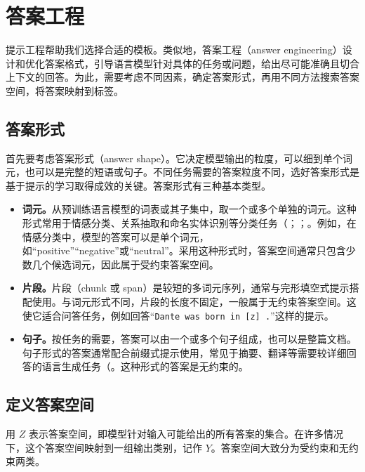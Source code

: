 \section{答案工程}
\label{sec:ch03-answers}
提示工程帮助我们选择合适的模板。类似地，答案工程（answer engineering）设计和优化答案格式，引导语言模型针对具体的任务或问题，给出尽可能准确且切合上下文的回答。为此，需要考虑不同因素，确定答案形式，再用不同方法搜索答案空间，将答案映射到标签。

\subsection{答案形式}
首先要考虑答案形式（answer shape）。它决定模型输出的粒度，可以细到单个词元，也可以是完整的短语或句子。不同任务需要的答案粒度不同，选好答案形式是基于提示的学习取得成效的关键。答案形式有三种基本类型。

\begin{itemize}
\item \textbf{词元。}从预训练语言模型的词表或其子集中，取一个或多个单独的词元。这种形式常用于情感分类、关系抽取和命名实体识别等分类任务（；；。例如，在情感分类中，模型的答案可以是单个词元，如“positive”“negative”或“neutral”。采用这种形式时，答案空间通常只包含少数几个候选词元，因此属于受约束答案空间。
\item \textbf{片段。}片段（chunk 或 span）是较短的多词元序列，通常与完形填空式提示搭配使用。与词元形式不同，片段的长度不固定，一般属于无约束答案空间。这使它适合问答任务，例如回答“\texttt{Dante was born in [z] .}”这样的提示。
\item \textbf{句子。}按任务的需要，答案可以由一个或多个句子组成，也可以是整篇文档。句子形式的答案通常配合前缀式提示使用，常见于摘要、翻译等需要较详细回答的语言生成任务（。这种形式的答案是无约束的。
\end{itemize}

\subsection{定义答案空间}
用 $Z$ 表示答案空间，即模型针对输入可能给出的所有答案的集合。在许多情况下，这个答案空间映射到一组输出类别，记作 $Y$。答案空间大致分为受约束和无约束两类。


